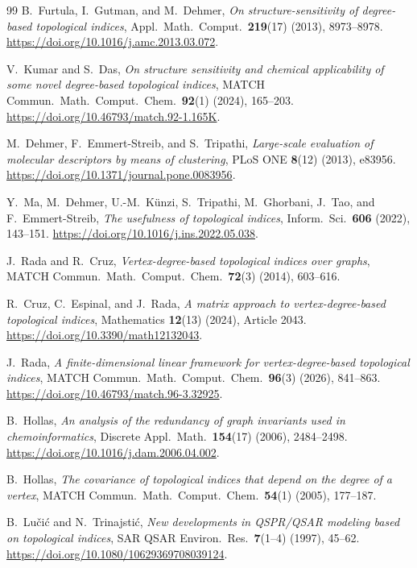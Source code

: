\documentclass[11pt,a4paper]{article}
\theoremstyle{definition}
\begin{document}
\begin{thebibliography}{99}
B.~Furtula, I.~Gutman, and M.~Dehmer,
\emph{On structure-sensitivity of degree-based topological indices},
Appl.~Math.~Comput.~\textbf{219}(17) (2013), 8973--8978.
\url{https://doi.org/10.1016/j.amc.2013.03.072}.

V.~Kumar and S.~Das,
\emph{On structure sensitivity and chemical applicability of some novel degree-based topological indices},
MATCH Commun.~Math.~Comput.~Chem.~\textbf{92}(1) (2024), 165--203.
\url{https://doi.org/10.46793/match.92-1.165K}.

M.~Dehmer, F.~Emmert-Streib, and S.~Tripathi,
\emph{Large-scale evaluation of molecular descriptors by means of clustering},
PLoS ONE \textbf{8}(12) (2013), e83956.
\url{https://doi.org/10.1371/journal.pone.0083956}.

Y.~Ma, M.~Dehmer, U.-M.~K\"unzi, S.~Tripathi, M.~Ghorbani, J.~Tao, and F.~Emmert-Streib,
\emph{The usefulness of topological indices},
Inform.~Sci.~\textbf{606} (2022), 143--151.
\url{https://doi.org/10.1016/j.ins.2022.05.038}.

J.~Rada and R.~Cruz,
\emph{Vertex-degree-based topological indices over graphs},
MATCH Commun.~Math.~Comput.~Chem.~\textbf{72}(3) (2014), 603--616.

R.~Cruz, C.~Espinal, and J.~Rada,
\emph{A matrix approach to vertex-degree-based topological indices},
Mathematics \textbf{12}(13) (2024), Article 2043.
\url{https://doi.org/10.3390/math12132043}.

J.~Rada,
\emph{A finite-dimensional linear framework for vertex-degree-based topological indices},
MATCH Commun.~Math.~Comput.~Chem.~\textbf{96}(3) (2026), 841--863.
\url{https://doi.org/10.46793/match.96-3.32925}.

B.~Hollas,
\emph{An analysis of the redundancy of graph invariants used in chemoinformatics},
Discrete Appl.~Math.~\textbf{154}(17) (2006), 2484--2498.
\url{https://doi.org/10.1016/j.dam.2006.04.002}.

B.~Hollas,
\emph{The covariance of topological indices that depend on the degree of a vertex},
MATCH Commun.~Math.~Comput.~Chem.~\textbf{54}(1) (2005), 177--187.

B.~Lu\v{c}i\'c and N.~Trinajsti\'c,
\emph{New developments in QSPR/QSAR modeling based on topological indices},
SAR QSAR Environ.~Res.~\textbf{7}(1--4) (1997), 45--62.
\url{https://doi.org/10.1080/10629369708039124}.


\end{thebibliography}
\end{document}
